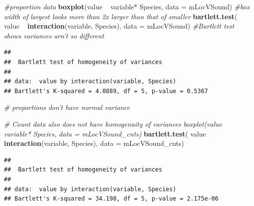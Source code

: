 \documentclass[]{article}
\newenvironment{Shaded}{\begin{snugshade}}{\end{snugshade}}
\newcommand{\KeywordTok}[1]{\textcolor[rgb]{0.13,0.29,0.53}{\textbf{{#1}}}}
\newcommand{\DataTypeTok}[1]{\textcolor[rgb]{0.13,0.29,0.53}{{#1}}}
\newcommand{\StringTok}[1]{\textcolor[rgb]{0.31,0.60,0.02}{{#1}}}
\newcommand{\CommentTok}[1]{\textcolor[rgb]{0.56,0.35,0.01}{\textit{{#1}}}}
\newcommand{\NormalTok}[1]{{#1}}
\begin{document}
\begin{Shaded}
\begin{Highlighting}[]
\CommentTok{#proportion data}
\KeywordTok{boxplot}\NormalTok{(value ~}\StringTok{  }\NormalTok{variable*}\StringTok{ }\NormalTok{Species, }\DataTypeTok{data =} \NormalTok{mLocVSound) }\CommentTok{#box width of largest looks more than 2x larger than that of smaller}
\KeywordTok{bartlett.test}\NormalTok{( value ~}\StringTok{  }\KeywordTok{interaction}\NormalTok{(variable, Species), }\DataTypeTok{data =} \NormalTok{mLocVSound) }\CommentTok{#Bartlett test shows variances arn't so different}
\end{Highlighting}
\end{Shaded}

\begin{verbatim}
## 
##  Bartlett test of homogeneity of variances
## 
## data:  value by interaction(variable, Species)
## Bartlett's K-squared = 4.0889, df = 5, p-value = 0.5367
\end{verbatim}

\begin{Shaded}
\begin{Highlighting}[]
\CommentTok{# proportions don't have normal variance}

\CommentTok{# Count data also does not have homogenaity of variances boxplot(value ~  variable* Species, data = mLocVSound_cnts)}
\KeywordTok{bartlett.test}\NormalTok{( value ~}\StringTok{  }\KeywordTok{interaction}\NormalTok{(variable, Species), }\DataTypeTok{data =} \NormalTok{mLocVSound_cnts)}
\end{Highlighting}
\end{Shaded}

\begin{verbatim}
## 
##  Bartlett test of homogeneity of variances
## 
## data:  value by interaction(variable, Species)
## Bartlett's K-squared = 34.198, df = 5, p-value = 2.175e-06
\end{verbatim}
\end{document}
